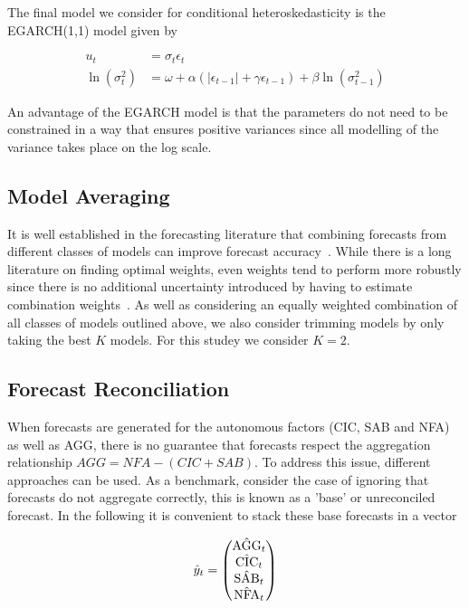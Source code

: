\documentclass{article}
\begin{document}
The final model we consider for conditional heteroskedasticity is the EGARCH(1,1) model \cite{Nel1991} given by

\begin{align}
  u_t&=\sigma_t\epsilon_t\\
  \ln(\sigma_t^2)&=\omega+\alpha \left(|\epsilon_{t-1}|+\gamma\epsilon_{t-1}\right)+\beta\ln(\sigma^2_{t-1})
\end{align}

An advantage of the EGARCH model is that the parameters do not need to be constrained in a way that ensures positive variances since all modelling of the variance takes place on the log scale. 

\subsection{Model Averaging}

It is well established in the forecasting literature that combining forecasts from different classes of models can improve forecast accuracy~\citep{Tim2006}. While there is a long literature on finding optimal weights, even weights tend to perform more robustly since there is no additional uncertainty introduced by having to estimate combination weights~\citep{SmiWal2009}. As well as considering an equally weighted combination of all classes of models outlined above, we also consider trimming models by only taking the best $K$ models. For this studey we consider $K=2$.%

\subsection{Forecast Reconciliation}\label{sec:forereco}

When forecasts are generated for the autonomous factors (CIC, SAB and NFA) as well as AGG, there is no guarantee that forecasts respect the aggregation relationship $AGG=NFA-(CIC+SAB)$. To address this issue, different approaches can be used. As a benchmark, consider the case of ignoring that forecasts do not aggregate correctly, this is known as a 'base' or unreconciled forecast. In the following it is convenient to stack these base forecasts in a vector

\[
\hat{\boldmath{y}}_t=\begin{pmatrix}\hat{\textrm{AGG}}_t\\
\hat{\textrm{CIC}}_t\\
\hat{\textrm{SAB}}_t\\
\hat{\textrm{NFA}}_t\end{pmatrix}
\]
\end{document}
